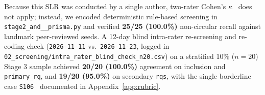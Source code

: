 \documentclass[10pt,twocolumn,a4paper]{article}
\begin{document}
Because this SLR was conducted by a single author, two-rater Cohen's $\kappa$~\cite{cohen1960coefficient,landis1977measurement} does not apply; instead, we encoded deterministic rule-based screening in \texttt{stage2\_\allowbreak and\_\_\allowbreak prisma.\allowbreak py} and verified \textbf{25/25 (100.0\%)} non-circular recall against landmark peer-reviewed seeds. A 12-day blind intra-rater re-screening and re-coding check (\texttt{2026-11-11} vs.\ \texttt{2026-11-23}, logged in \texttt{02\_\allowbreak screening/\allowbreak intra\_\allowbreak rater\_\allowbreak blind\_\allowbreak check\_\allowbreak n20.\allowbreak csv}) on a stratified 10\% ($n=20$) Stage 3 sample achieved \textbf{20/20 (100.0\%)} agreement on inclusion and \texttt{primary\_rq}, and \textbf{19/20 (95.0\%)} on secondary \texttt{rqs}, with the single borderline case \texttt{S106}~\cite{guo2026eet} documented in Appendix~\ref{app:rubric}.
\end{document}
